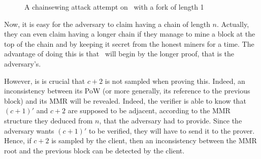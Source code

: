       \begin{figure}[ht]
        \centering
          \caption{A chainsewing attack attempt on \FC\ with a fork of length 1}
          \label{figure:chainsewingattack}
        \end{figure}
        
      Now, it is easy for the adversary to claim having a chain of length \(n\). Actually, they can even claim having a longer chain if they manage to mine a block at the top of the chain and by keeping it secret from the honest miners for a time. The advantage of doing this is that \FC\ will begin by the longer proof, that is the adversary's.
      
      However, is is crucial that \(c+2\) is not sampled when proving this. Indeed, an inconsistency between its PoW (or more generally, its reference to the previous block) and its MMR will be revealed. Indeed, the verifier is able to know that \((c+1)'\) and \(c+2\) are supposed to be adjacent, according to the MMR structure they deduced from \(n\), that the adversary had to provide. Since the adversary wants \((c+1)'\) to be verified, they will have to send it to the prover. Hence, if \(c+2\) is sampled by the client, then an inconsistency between the MMR root and the previous block can be detected by the client.
      
